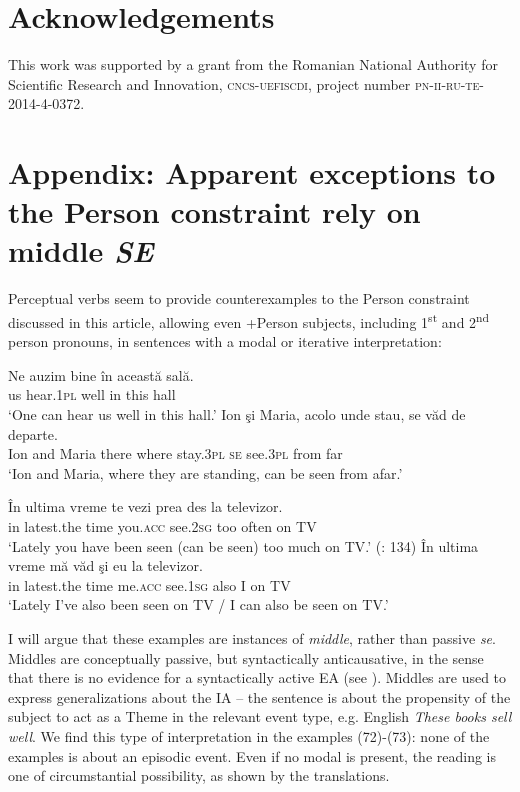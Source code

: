 \documentclass[output=paper]{langsci/langscibook}
\begin{document}
\section*{Acknowledgements}
This work was supported by a grant from the Romanian National Authority for Scientific Research and Innovation, \textsc{cncs-uefiscdi}, project number \textsc{pn-ii-ru-te-2014-4-0372}. 

\section*{Appendix: Apparent exceptions to the Person constraint rely on middle \textit{SE}}

Perceptual verbs seem to provide counterexamples to the Person constraint discussed in this article, allowing even +Person subjects, including 1\textsuperscript{st} and 2\textsuperscript{nd} person pronouns, in sentences with a modal or iterative interpretation:

\ea%
    \label{ex:giurgea:72}
    \ea
    \gll Ne auzim    bine în această sală.    \\
         us  hear.\textsc{1pl} well in this      hall\\
    \glt ‘One can hear us well in this hall.’
    \ex
    \gll  Ion şi   Maria,  acolo  unde  stau,      se văd       de     departe.\\
          Ion and Maria  there where stay.\textsc{3pl} \textsc{se} see.\textsc{3pl} from far\\
    \glt ‘Ion and Maria, where they are standing, can be seen from afar.’
    \z
\z

\ea%
    \label{ex:giurgea:73}
    \ea
    \gll În ultima     vreme te            vezi       prea des     la   televizor. \\
         in latest.the time   you.\textsc{acc}  see.\textsc{2sg} too    often on TV\\
    \glt ‘Lately you have been seen (can be seen) too much on TV.’ (\citealt{Dobrovie-Sorin2017}: 134)
    \ex
    \gll În ultima     vreme  mă        văd       şi     eu  la   televizor.\\
         in latest.the time     me.\textsc{acc} see.\textsc{1sg} also I    on TV\\
    \glt ‘Lately I’ve also been seen on TV / I can also be seen on TV.’
    \z
\z

I will argue that these examples are instances of \textit{middle}, rather than passive \textit{se}. Middles are conceptually passive, but syntactically anticausative, in the sense that there is no evidence for a syntactically active EA (see \citealt{Schäfer2008}). Middles are used to express generalizations about the IA -- the sentence is about the propensity of the subject to act as a Theme in the relevant event type, e.g. English \textit{These books sell well}. We find this type of interpretation in the examples (72)-(73): none of the examples is about an episodic event. Even if no modal is present, the reading is one of circumstantial possibility, as shown by the translations. 
\end{document}
